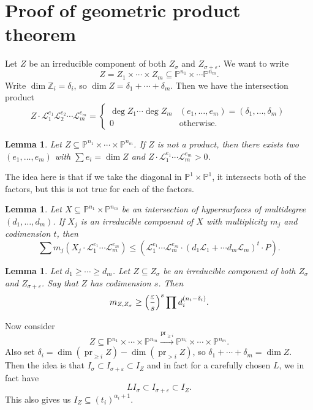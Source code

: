 \documentclass[leqno, openany]{memoir}
\newtheorem{lem}[thm]{Lemma}
\theoremstyle{definition}
\theoremstyle{remark}
\theoremstyle{plain}
\theoremstyle{definition}
\theoremstyle{remark}
\newcommand{\Z}{\mathbb{Z}}
\renewcommand{\P}{\mathbb{P}}
\newcommand{\ep}{\varepsilon}
\newcommand{\mc}[1]{\mathcal{#1}}
\newcommand{\mr}[1]{\mathrm{#1}}
\newcommand{\on}[1]{\operatorname{#1}}
\begin{document}
\section{Proof of geometric product theorem}

Let $Z$ be an irreducible component of both $Z_{\sigma}$ and $Z_{\sigma + \ep}$. We want to write 
\[ Z = Z_1 \times \cdots \times Z_m \subseteq \P^{n_1} \times \cdots \P^{n_m}. \]
Write $\dim \Z_i = \delta_i$, so $\dim Z = \delta_1 + \cdots + \delta_m$. Then we have the intersection product
\[ Z \cdot \mc{L}_1^{e_1} \mc{L}_2^{e_2} \cdots \mc{L}_m^{e_m} = \begin{cases}
    \deg Z_1 \cdots \deg Z_m & (e_1, \ldots, e_m) = (\delta_1, \ldots, \delta_m) \\
    0 & \text{otherwise}.
\end{cases}
\]

\begin{lem}
    Let $Z \subseteq \P^{n_1} \times \cdots \times \P^{n_m}$. If $Z$ is not a product, then there exists two $(e_1, \ldots, e_m)$ with $\sum e_i = \dim Z$ and $Z \cdot \mc{L}_1^{e_1} \cdots \mc{L}_m^{e_m} > 0$.
\end{lem}

The idea here is that if we take the diagonal in $\P^1 \times \P^1$, it intersects both of the factors, but this is not true for each of the factors.

\begin{lem}
    Let $X \subseteq \P^{n_1} \times \P^{n_m}$ be an intersection of hypersurfaces of multidegree $(d_1, \ldots, d_m)$. If $X_j$ is an irreducible compoennt of $X$ with multiplicity $m_j$ and codimension $t$, then
    \[ \sum m_j (X_j \cdot \mc{L}_1^{e_1} \cdots \mc{L}_m^{e_m}) \leq (\mc{L}_1^{e_1} \cdots \mc{L}_m^{e_m} \cdot (d_1 \mc{L}_1 + \cdots d_m \mc{L}_m)^t \cdot P). \]
\end{lem}

\begin{lem}
    Let $d_1 \geq \cdots \geq d_m$. Let $Z \subseteq Z_{\sigma}$ be an irreducible component of both $Z_{\sigma}$ and $Z_{\sigma + \ep}$. Say that $Z$ has codimension $s$. Then
    \[ m_{Z, Z_{\sigma}} \geq \qty(\frac{\ep}{s})^s \prod d_i^{(n_i - \delta_i)}. \]
\end{lem}

Now consider 
\[ Z \subseteq \P^{n_1} \times \cdots \times \P^{n_m} \xrightarrow{\mr{pr}_{\geq i}} \P^{n_i} \times \cdots \times \P^{n_m}. \] 
Also set $\delta_i = \dim (\on{pr}_{\geq i} Z) - \dim(\on{pr}_{>i} Z)$, so $\delta_1 + \cdots + \delta_m = \dim Z$. Then the idea is that $I_{\sigma} \subset I_{\sigma + \ep} \subset I_Z$ and in fact for a carefully chosen $L$, we in fact have
\[ L I_{\sigma} \subset I_{\sigma + \ep} \subset I_Z. \]
This also gives us $I_Z \subseteq (t_i)^{\alpha_i + 1}$.
\end{document}
